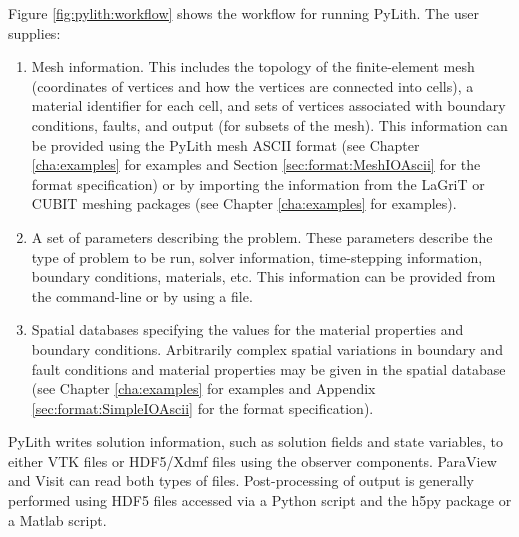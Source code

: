 Figure \vref{fig:pylith:workflow} shows the workflow for running PyLith.
The user supplies:
\begin{enumerate}
\item Mesh information. This includes the topology of the
  finite-element mesh (coordinates of vertices and how the vertices
  are connected into cells), a material identifier for each cell, and
  sets of vertices associated with boundary conditions, faults, and
  output (for subsets of the mesh). This information can be provided
  using the PyLith mesh ASCII format (see Chapter \vref{cha:examples}
  for examples and Section \vref{sec:format:MeshIOAscii} for the format
  specification) or by importing the information from the LaGriT or
  CUBIT meshing packages (see Chapter \vref{cha:examples} for
  examples).
\item A set of parameters describing the problem. These parameters
  describe the type of problem to be run, solver information,
  time-stepping information, boundary conditions, materials, etc. This
  information can be provided from the command-line or by using a
   file.
\item Spatial databases specifying the values for the material
  properties and boundary conditions. Arbitrarily complex spatial
  variations in boundary and fault conditions and material properties
  may be given in the spatial database (see Chapter
  \vref{cha:examples} for examples and Appendix
  \vref{sec:format:SimpleIOAscii} for the format specification).
\end{enumerate}
PyLith writes solution information, such as solution fields and state
variables, to either VTK files or HDF5/Xdmf files using the observer
components. ParaView and Visit can read both types of
files. Post-processing of output is generally performed using HDF5
files accessed via a Python script and the h5py package or a Matlab
script.

